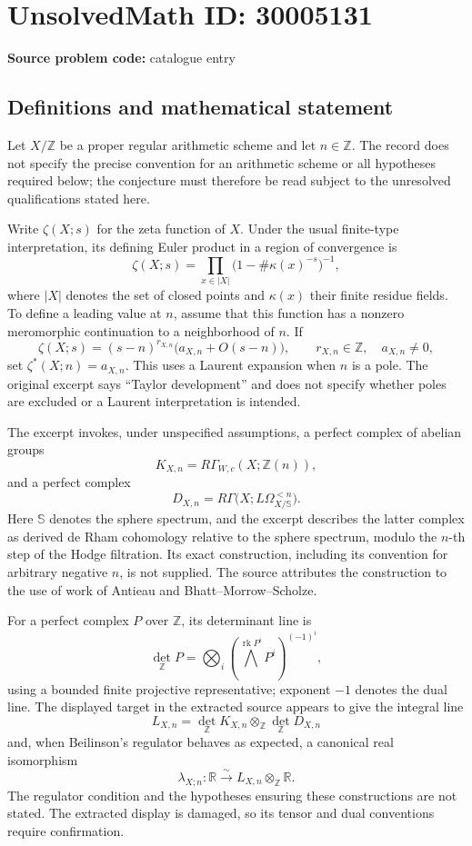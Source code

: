 \documentclass[11pt]{article}
\newcommand{\Z}{\mathbb{Z}}
\newcommand{\R}{\mathbb{R}}
\begin{document}
\section*{UnsolvedMath ID: 30005131}
\textbf{Source problem code:} catalogue entry
\subsection{Definitions and mathematical statement}
Let \(X/\Z\) be a proper regular arithmetic scheme and let \(n\in\Z\). The record does not specify the precise convention for an arithmetic scheme or all hypotheses required below; the conjecture must therefore be read subject to the unresolved qualifications stated here.

Write \(\zeta(X;s)\) for the zeta function of \(X\). Under the usual finite-type interpretation, its defining Euler product in a region of convergence is
\[
\zeta(X;s)=\prod_{x\in |X|}\bigl(1-\#\kappa(x)^{-s}\bigr)^{-1},
\]
where \(|X|\) denotes the set of closed points and \(\kappa(x)\) their finite residue fields. To define a leading value at \(n\), assume that this function has a nonzero meromorphic continuation to a neighborhood of \(n\). If
\[
\zeta(X;s)=(s-n)^{r_{X,n}}\bigl(a_{X,n}+O(s-n)\bigr),
\qquad r_{X,n}\in\Z,\quad a_{X,n}\ne0,
\]
set \(\zeta^*(X;n)=a_{X,n}\). This uses a Laurent expansion when \(n\) is a pole. The original excerpt says ``Taylor development'' and does not specify whether poles are excluded or a Laurent interpretation is intended.

The excerpt invokes, under unspecified assumptions, a perfect complex of abelian groups
\[
K_{X,n}=R\Gamma_{W,c}(X;\Z(n)),
\]
and a perfect complex
\[
D_{X,n}=R\Gamma\bigl(X;L\Omega^{<n}_{X/\mathbb S}\bigr).
\]
Here \(\mathbb S\) denotes the sphere spectrum, and the excerpt describes the latter complex as derived de Rham cohomology relative to the sphere spectrum, modulo the \(n\)-th step of the Hodge filtration. Its exact construction, including its convention for arbitrary negative \(n\), is not supplied. The source attributes the construction to the use of work of Antieau and Bhatt--Morrow--Scholze.

For a perfect complex \(P\) over \(\Z\), its determinant line is
\[
\det_{\Z}P=\bigotimes_i\left(\bigwedge^{\operatorname{rk}P^i}P^i\right)^{(-1)^i},
\]
using a bounded finite projective representative; exponent \(-1\) denotes the dual line. The displayed target in the extracted source appears to give the integral line
\[
L_{X,n}=\det_{\Z}K_{X,n}\otimes_{\Z}\det_{\Z}D_{X,n}
\]
and, when Beilinson's regulator behaves as expected, a canonical real isomorphism
\[
\lambda_{X;n}:\R\xrightarrow{\sim}L_{X,n}\otimes_{\Z}\R.
\]
The regulator condition and the hypotheses ensuring these constructions are not stated. The extracted display is damaged, so its tensor and dual conventions require confirmation.
\end{document}
